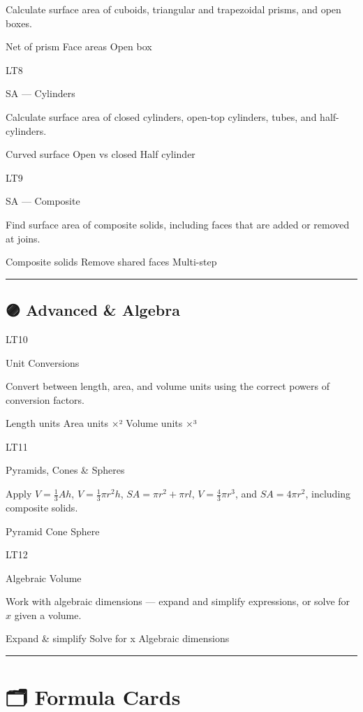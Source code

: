 \documentclass[
  letterpaper,
  DIV=11,
  numbers=noendperiod]{scrreprt}
\theoremstyle{definition}
\theoremstyle{remark}
\begin{document}
Calculate surface area of cuboids, triangular and trapezoidal prisms,
and open boxes.

{Net of prism} {Face areas} {Open box}

LT8

SA --- Cylinders

Calculate surface area of closed cylinders, open-top cylinders, tubes,
and half-cylinders.

{Curved surface} {Open vs closed} {Half cylinder}

LT9

SA --- Composite

Find surface area of composite solids, including faces that are added or
removed at joins.

{Composite solids} {Remove shared faces} {Multi-step}

\begin{center}\rule{0.5\linewidth}{0.5pt}\end{center}

\subsection*{🟣 Advanced \& Algebra}\label{advanced-algebra}

LT10

Unit Conversions

Convert between length, area, and volume units using the correct powers
of conversion factors.

{Length units} {Area units ×²} {Volume units ×³}

LT11

Pyramids, Cones \& Spheres

Apply \(V=\tfrac{1}{3}Ah\), \(V=\tfrac{1}{3}\pi r^2h\),
\(SA=\pi r^2+\pi rl\), \(V=\tfrac{4}{3}\pi r^3\), and \(SA=4\pi r^2\),
including composite solids.

{Pyramid} {Cone} {Sphere}

LT12

Algebraic Volume

Work with algebraic dimensions --- expand and simplify expressions, or
solve for \(x\) given a volume.

{Expand \& simplify} {Solve for x} {Algebraic dimensions}

\begin{center}\rule{0.5\linewidth}{0.5pt}\end{center}

\section{🗂️ Formula Cards}\label{formula-cards-1}
\end{document}
